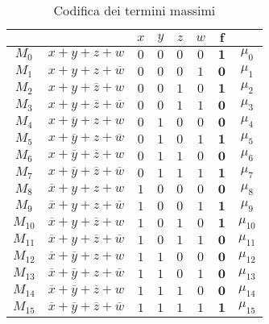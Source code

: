 \documentclass[a4paper]{extarticle}
\begin{document}
\begin{table}[H]
  \centering
  \noindent
  \begin{tabular}{c|c||cccc||c|c}
    $ $ & $ $ & $x$ & $y$ & $z$ & $w$ & $\boldsymbol{f}$\\
    \hline
    $M_0$ & $x + y + z + w$ & $0$ & $0$ & $0$ & $0$ & $\boldsymbol{1}$ & $\mu_0$\\
    $M_1$ & $x + y + z + \overline{w}$ & $0$ & $0$ & $0$ & $1$ & $\boldsymbol{0}$ & $\mu_1$\\
    $M_2$ & $x + y + \overline{z} + w$ & $0$ & $0$ & $1$ & $0$ & $\boldsymbol{1}$ & $\mu_2$\\
    $M_3$ & $x + y + \overline{z} + \overline{w}$ & $0$ & $0$ & $1$ & $1$ & $\boldsymbol{0}$ & $\mu_3$\\
    $M_4$ & $x + \overline{y} + z + w$ & $0$ & $1$ & $0$ & $0$ & $\boldsymbol{0}$ & $\mu_4$\\
    $M_5$ & $x + \overline{y} + z + \overline{w}$ & $0$ & $1$ & $0$ & $1$ & $\boldsymbol{1}$ & $\mu_5$\\
    $M_6$ & $x + \overline{y} + \overline{z} + w$ & $0$ & $1$ & $1$ & $0$ & $\boldsymbol{0}$ & $\mu_6$\\
    $M_7$ & $x + \overline{y} + \overline{z} + \overline{w}$ & $0$ & $1$ & $1$ & $1$ & $\boldsymbol{1}$ & $\mu_7$\\
    $M_8$ & $\overline{x} + y + z + w$ & $1$ & $0$ & $0$ & $0$ & $\boldsymbol{0}$ & $\mu_8$\\
    $M_9$ & $\overline{x} + y + z + \overline{w}$ & $1$ & $0$ & $0$ & $1$ & $\boldsymbol{1}$ & $\mu_9$\\
    $M_{10}$ & $\overline{x} + y + \overline{z} + w$ & $1$ & $0$ & $1$ & $0$ & $\boldsymbol{1}$ & $\mu_{10}$\\
    $M_{11}$ & $\overline{x} + y + \overline{z} + \overline{w}$ & $1$ & $0$ & $1$ & $1$ & $\boldsymbol{0}$ & $\mu_{11}$\\
    $M_{12}$ & $\overline{x} + \overline{y} + z + w$ & $1$ & $1$ & $0$ & $0$ & $\boldsymbol{0}$ & $\mu_{12}$\\
    $M_{13}$ & $\overline{x} + \overline{y} + z + \overline{w}$ & $1$ & $1$ & $0$ & $1$ & $\boldsymbol{0}$ & $\mu_{13}$\\
    $M_{14}$ & $\overline{x} + \overline{y} + \overline{z} + w$ & $1$ & $1$ & $1$ & $0$ & $\boldsymbol{0}$ & $\mu_{14}$\\
    $M_{15}$ & $\overline{x} + \overline{y} + \overline{z} + \overline{w}$ & $1$ & $1$ & $1$ & $1$ & $\boldsymbol{1}$ & $\mu_{15}$\\
  \end{tabular}
  \caption{Codifica dei termini massimi}
  \label{tab:codifica_termini_massimi}
\end{table}
\end{document}
